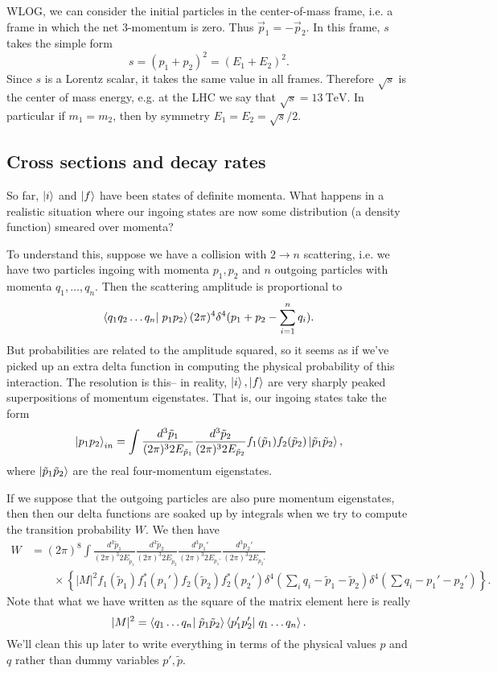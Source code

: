 WLOG, we can consider the initial particles in the center-of-mass frame, i.e. a frame in which the net $3$-momentum is zero. Thus $\vec{p}_1=-\vec{p}_2.$
In this frame, $s$ takes the simple form
$$s=(p_1+p_2)^2=(E_1+E_2)^2.$$ Since $s$ is a Lorentz scalar, it takes the same value in all frames. Therefore $\sqrt{s}$ is the center of mass energy, e.g. at the LHC we say that $\sqrt{s}=\SI{13}{\tera\electronvolt}$. In particular if $m_1=m_2$, then by symmetry $E_1=E_2=\sqrt{s}/2.$

\subsection*{Cross sections and decay rates} So far, $\left| i \right>$ and $\left| f \right>$ have been states of definite momenta. What happens in a realistic situation where our ingoing states are now some distribution (a density function) smeared over momenta?

To understand this, suppose we have a collision with $2\to n$ scattering, i.e. we have two particles ingoing with momenta $p_1,p_2$ and $n$ outgoing particles with momenta $q_1,\ldots,q_n$. Then the scattering amplitude is proportional to
$$\braket{q_1 q_2\ldots q_n}{p_1p_2}(2\pi)^4 \delta^4(p_1+p_2 -\sum_{i=1}^n q_i).$$
But probabilities are related to the amplitude squared, so it seems as if we've picked up an extra delta function in computing the physical probability of this interaction. The resolution is this-- in reality, $\left| i \right>,\left| f \right>$ are very sharply peaked superpositions of momentum eigenstates. That is, our ingoing states take the form
$$\left| p_1p_2 \right>_{in}=\int \frac{d^3 \tilde p_1}{(2\pi)^3 2E_{\tilde p_1}}\frac{d^3 \tilde p_2}{(2\pi)^3 2E_{\tilde p_2}} f_1(\tilde p_1)f_2 (\tilde p_2)\left| \tilde p_1 \tilde p_2 \right>,$$
where $\left| \tilde p_1 \tilde p_2 \right>$ are the real four-momentum eigenstates.

If we suppose that the outgoing particles are also pure momentum eigenstates, then then our delta functions are soaked up by integrals when we try to compute the transition probability $W$. We then have
\begin{align*}
    W &= (2\pi)^8\int \frac{d^3 \tilde p_1}{(2\pi)^3 2E_{\tilde p_1}} 
        \frac{d^3 \tilde p_2}{(2\pi)^3 2E_{\tilde p_2}} \frac{d^3 p_1'}{(2\pi)^3 2E_{p_1'}} \frac{d^3 p_2'}{(2\pi)^3 2E_{p_2'}}\\ 
        &{}\qquad \times\left\{|M|^2 f_1(\tilde p_1)f_1^* (p_1')f_2(\tilde p_2)f_2^*(p_2')\delta^4(\sum_i q_i -\tilde p_1 -\tilde p_2)\delta^4(\sum q_i-p_1' -p_2')\right\}.
\end{align*}
Note that what we have written as the square of the matrix element here is really $$|M|^2=\braket{q_1\ldots q_n}{\tilde p_1 \tilde p_2}\braket{p_1'p_2'}{q_1\ldots q_n}.$$ We'll clean this up later to write everything in terms of the physical values $p$ and $q$ rather than dummy variables $p', \tilde p.$

